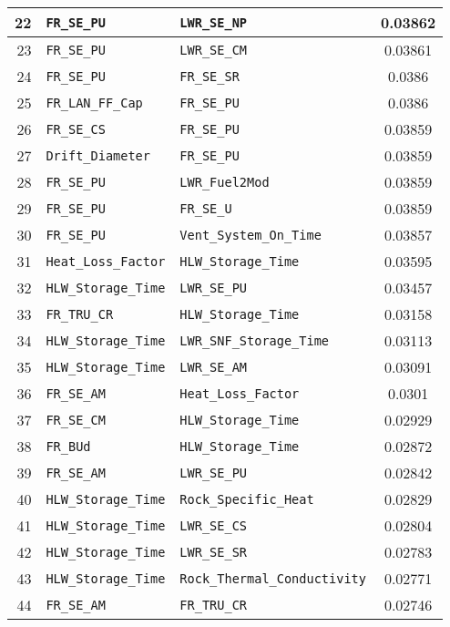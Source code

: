 \begin{center}
\begin{table}[htbp]
\begin{center}
\begin{tabular}{|r|l|l|c|}
\hline
22&\texttt{FR\_SE\_PU}&\texttt{LWR\_SE\_NP}&0.03862\\
\hline
23&\texttt{FR\_SE\_PU}&\texttt{LWR\_SE\_CM}&0.03861\\
\hline
24&\texttt{FR\_SE\_PU}&\texttt{FR\_SE\_SR}&0.0386\\
\hline
25&\texttt{FR\_LAN\_FF\_Cap}&\texttt{FR\_SE\_PU}&0.0386\\
\hline
26&\texttt{FR\_SE\_CS}&\texttt{FR\_SE\_PU}&0.03859\\
\hline
27&\texttt{Drift\_Diameter}&\texttt{FR\_SE\_PU}&0.03859\\
\hline
28&\texttt{FR\_SE\_PU}&\texttt{LWR\_Fuel2Mod}&0.03859\\
\hline
29&\texttt{FR\_SE\_PU}&\texttt{FR\_SE\_U}&0.03859\\
\hline
30&\texttt{FR\_SE\_PU}&\texttt{Vent\_System\_On\_Time}&0.03857\\
\hline
31&\texttt{Heat\_Loss\_Factor}&\texttt{HLW\_Storage\_Time}&0.03595\\
\hline
32&\texttt{HLW\_Storage\_Time}&\texttt{LWR\_SE\_PU}&0.03457\\
\hline
33&\texttt{FR\_TRU\_CR}&\texttt{HLW\_Storage\_Time}&0.03158\\
\hline
34&\texttt{HLW\_Storage\_Time}&\texttt{LWR\_SNF\_Storage\_Time}&0.03113\\
\hline
35&\texttt{HLW\_Storage\_Time}&\texttt{LWR\_SE\_AM}&0.03091\\
\hline
36&\texttt{FR\_SE\_AM}&\texttt{Heat\_Loss\_Factor}&0.0301\\
\hline
37&\texttt{FR\_SE\_CM}&\texttt{HLW\_Storage\_Time}&0.02929\\
\hline
38&\texttt{FR\_BUd}&\texttt{HLW\_Storage\_Time}&0.02872\\
\hline
39&\texttt{FR\_SE\_AM}&\texttt{LWR\_SE\_PU}&0.02842\\
\hline
40&\texttt{HLW\_Storage\_Time}&\texttt{Rock\_Specific\_Heat}&0.02829\\
\hline
41&\texttt{HLW\_Storage\_Time}&\texttt{LWR\_SE\_CS}&0.02804\\
\hline
42&\texttt{HLW\_Storage\_Time}&\texttt{LWR\_SE\_SR}&0.02783\\
\hline
43&\texttt{HLW\_Storage\_Time}&\texttt{Rock\_Thermal\_Conductivity}&0.02771\\
\hline
44&\texttt{FR\_SE\_AM}&\texttt{FR\_TRU\_CR}&0.02746\\
\hline
\end{tabular}
\end{center}
\end{table}
\end{center}

